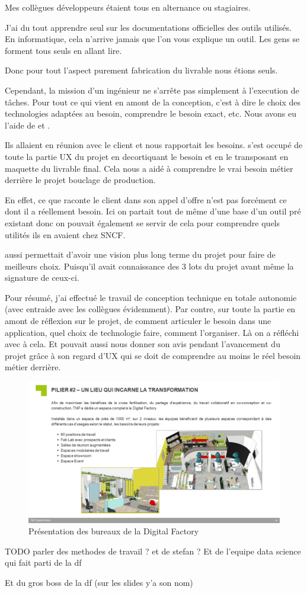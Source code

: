 Mes collègues développeurs étaient tous en alternance ou stagiaires.

J'ai du tout apprendre seul sur les documentations officielles des outils utilisés. En informatique, cela n'arrive jamais que l'on vous explique un outil. Les gens se forment tous seuls en allant lire.

Donc pour tout l'aspect purement fabrication du livrable nous étions seuls.

Cependant, la mission d'un ingénieur ne s'arrête pas simplement à l'execution de tâches. Pour tout ce qui vient en amont de la conception, c'est à dire le choix des technologies adaptées au besoin, comprendre le besoin exact, etc. Nous avons eu l'aide de \damien et \stefan.

Ils allaient en réunion avec le client et nous rapportait les besoins. \stefan s'est occupé de toute la partie UX du projet en decortiquant le besoin et en le transposant en maquette du livrable final. Cela nous a aidé à comprendre le vrai besoin métier derrière le projet bouclage de production.

En effet, ce que raconte le client dans son appel d'offre n'est pas forcément ce dont il a réellement besoin. Ici on partait tout de même d'une base d'un outil pré existant donc on pouvait également se servir de cela pour comprendre quels utilités ils en avaient chez SNCF.

\damien aussi permettait d'avoir une vision plus long terme du projet pour faire de meilleurs choix. Puisqu'il avait connaissance des 3 lots du projet avant même la signature de ceux-ci.

Pour résumé, j'ai effectué le travail de conception technique en totale autonomie (avec entraide avec les collègues évidemment). Par contre, sur toute la partie en amont de réflexion sur le projet, de comment articuler le besoin dans une application, quel choix de technologie faire, comment l'organiser. Là on a réfléchi avec \damien à cela. Et \stefan pouvait aussi nous donner son avis pendant l'avancement du projet grâce à son regard d'UX qui se doit de comprendre au moins le réel besoin métier derrière.

\begin{figure}[H]
    \centering
    \includegraphics[width=.8\linewidth]{img/digital_factory_lieu.png}
    \caption{Présentation des bureaux de la Digital Factory}
\end{figure}

TODO parler des methodes de travail ? et de stefan ?
Et de l'equipe data science qui fait parti de la df

Et du gros boss de la df (sur les slides y'a son nom)